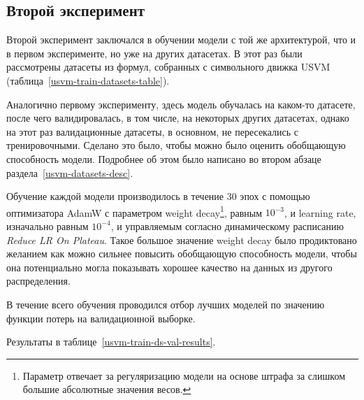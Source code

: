 \subsection{Второй эксперимент}

Второй эксперимент заключался в обучении модели с той же архитектурой, что и в первом эксперименте, но уже на других датасетах. В этот раз были рассмотрены датасеты из формул, собранных с символьного движка USVM (таблица~\ref{usvm-train-datasets-table}).

Аналогично первому эксперименту, здесь модель обучалась на каком-то датасете, после чего валидировалась, в том числе, на некоторых других датасетах, однако на этот раз валидационные датасеты, в основном, не пересекались с тренировочными. Сделано это было, чтобы можно было оценить обобщающую способность модели. Подробнее об этом было написано во втором абзаце раздела~\ref{usvm-datasets-desc}.

Обучение каждой модели производилось в течение 30 эпох с помощью оптимизатора AdamW \cite{adamw-paper} с параметром weight decay\footnote{Параметр отвечает за регуляризацию модели на основе штрафа за слишком большие абсолютные значения весов.}, равным $10^{-3}$, и learning rate, изначально равным $10^{-4}$, и управляемым согласно динамическому расписанию \textit{Reduce LR On Plateau}. Такое большое значение weight decay было продиктовано желанием как можно сильнее повысить обобщающую способность модели, чтобы она потенциально могла показывать хорошее качество на данных из другого распределения.

В течение всего обучения проводился отбор лучших моделей по значению функции потерь на валидационной выборке.

Результаты в таблице~\ref{usvm-train-ds-val-results}.

